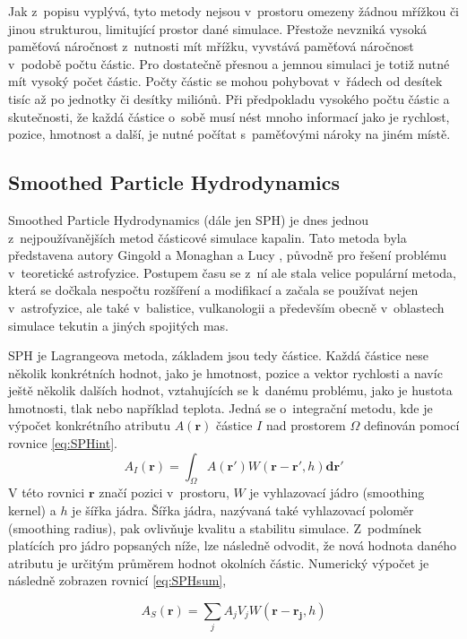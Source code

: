 Jak z~popisu vyplývá, tyto metody nejsou v~prostoru omezeny žádnou mřížkou či jinou strukturou, limitující prostor dané simulace. Přestože nevzniká vysoká paměťová náročnost z~nutnosti mít mřížku, vyvstává paměťová náročnost v~podobě počtu částic. Pro dostatečně přesnou a jemnou simulaci je totiž nutné mít vysoký počet částic. Počty částic se mohou pohybovat v~řádech od desítek tisíc až po jednotky či desítky miliónů. Při předpokladu  vysokého počtu částic a skutečnosti, že každá částice o~sobě musí nést mnoho informací jako je rychlost, pozice, hmotnost a další, je nutné počítat s~paměťovými nároky na jiném místě.

\subsection{Smoothed Particle Hydrodynamics}
\label{chapter:SPH}
Smoothed Particle Hydrodynamics (dále jen SPH) je dnes jednou z~nejpoužívanějších metod částicové simulace kapalin. Tato metoda byla představena autory Gingold a Monaghan \cite{Monaghan77} a Lucy \cite{Lucy77}, původně pro řešení problému v~teoretické astrofyzice. Postupem času se z~ní ale stala velice populární metoda, která se dočkala nespočtu rozšíření a modifikací a začala se používat nejen v~astrofyzice, ale také v~balistice, vulkanologii a především obecně v~oblastech simulace tekutin a jiných spojitých mas.

SPH je Lagrangeova metoda, základem jsou tedy částice. Každá částice nese několik konkrétních hodnot, jako je hmotnost, pozice a vektor rychlosti a navíc ještě několik dalších hodnot, vztahujících se k~danému problému, jako je hustota hmotnosti, tlak nebo například teplota. Jedná se o~integrační metodu, kde je výpočet konkrétního atributu $A(\mathbf{r})$ částice $I$ nad prostorem $\Omega$ definován pomocí rovnice \ref{eq:SPHint}.
\begin{equation}
	A_I(\mathbf{r}) = \int_\Omega A(\mathbf{r}')W(\mathbf{r} - \mathbf{r'},h)\mathbf{dr}'
	\label{eq:SPHint}
\end{equation}
V této rovnici $\mathbf{r}$ značí pozici v~prostoru, $W$ je vyhlazovací jádro (smoothing kernel) a $h$ je šířka jádra. Šířka jádra, nazývaná také vyhlazovací poloměr (smoothing radius), pak ovlivňuje kvalitu a stabilitu simulace. Z~podmínek platících pro jádro popsaných níže, lze následně odvodit, že nová hodnota daného atributu je určitým průměrem hodnot okolních částic.
Numerický výpočet je následně zobrazen rovnicí \ref{eq:SPHsum},

\begin{equation}
	A_S(\mathbf{r}) = \sum_j A_j V_j W(\mathbf{r} - \mathbf{r_j},h)
	\label{eq:SPHsum}
\end{equation}

